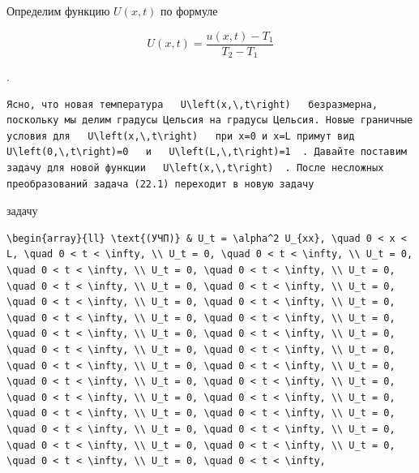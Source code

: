 \documentclass[
  ukrainian,
]{article}
\begin{document}
Определим функцию \(U(x, t)\) по формуле

\[
U(x, t) = \frac{u(x, t) - T_1}{T_2 - T_1}
\]

.

\begin{verbatim}
Ясно, что новая температура   U\left(x,\,t\right)   безразмерна, поскольку мы делим градусы Цельсия на градусы Цельсия. Новые граничные условия для   U\left(x,\,t\right)   при x=0 и x=L примут вид   U\left(0,\,t\right)=0   и   U\left(L,\,t\right)=1  . Давайте поставим задачу для новой функции   U\left(x,\,t\right)  . После несложных преобразований задача (22.1) переходит в новую задачу
\end{verbatim}

задачу

\begin{verbatim}
\begin{array}{ll} \text{(УЧП)} & U_t = \alpha^2 U_{xx}, \quad 0 < x < L, \quad 0 < t < \infty, \\ U_t = 0, \quad 0 < t < \infty, \\ U_t = 0, \quad 0 < t < \infty, \\ U_t = 0, \quad 0 < t < \infty, \\ U_t = 0, \quad 0 < t < \infty, \\ U_t = 0, \quad 0 < t < \infty, \\ U_t = 0, \quad 0 < t < \infty, \\ U_t = 0, \quad 0 < t < \infty, \\ U_t = 0, \quad 0 < t < \infty, \\ U_t = 0, \quad 0 < t < \infty, \\ U_t = 0, \quad 0 < t < \infty, \\ U_t = 0, \quad 0 < t < \infty, \\ U_t = 0, \quad 0 < t < \infty, \\ U_t = 0, \quad 0 < t < \infty, \\ U_t = 0, \quad 0 < t < \infty, \\ U_t = 0, \quad 0 < t < \infty, \\ U_t = 0, \quad 0 < t < \infty, \\ U_t = 0, \quad 0 < t < \infty, \\ U_t = 0, \quad 0 < t < \infty, \\ U_t = 0, \quad 0 < t < \infty, \\ U_t = 0, \quad 0 < t < \infty, \\ U_t = 0, \quad 0 < t < \infty, \\ U_t = 0, \quad 0 < t < \infty, \\ U_t = 0, \quad 0 < t < \infty, \\ U_t = 0, \quad 0 < t < \infty, \\ U_t = 0, \quad 0 < t < \infty, \\ U_t = 0, \quad 0 < t < \infty, \\ U_t = 0, \quad 0 < t < \infty, 
\end{verbatim}
\end{document}
